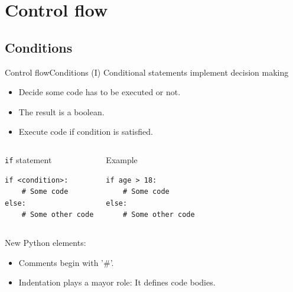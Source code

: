 \documentclass[10pt,compress]{beamer} %
\begin{document}
%		

\section{Control flow}
\subsection{Conditions}

\begin{frame}[fragile]{Control flow}{Conditions (I)}
	Conditional statements implement decision making
	\begin{itemize}
	\item Decide some code has to be executed or not.
	\item The result is a boolean.
	\item Execute code if condition is satisfied.
	\end{itemize}

	\begin{columns}
	\begin{block}{\texttt{if} statement}
		\begin{verbatim}
if <condition>:
    # Some code
else:
    # Some other code
\end{verbatim}
		\end{block}

	\begin{exampleblock}{Example}
		\begin{verbatim}
if age > 18:
    # Some code
else:
    # Some other code
\end{verbatim}
		\end{exampleblock}
	
	\end{columns}

   New Python elements:
	\begin{itemize}
	\item Comments begin with '\#'.
	\item \alert{Indentation plays a mayor role: It defines code bodies.}
	\end{itemize}
	
\end{frame}
\end{document}
